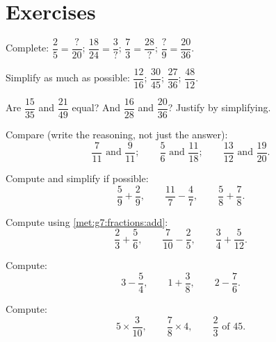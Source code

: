 \section{Exercises}

\begin{exercise}[$\star$]\label{exo:g7:fractions:1}
Complete: $\dfrac{2}{5} = \dfrac{?}{20}$; \quad
$\dfrac{18}{24} = \dfrac{3}{?}$; \quad
$\dfrac{7}{3} = \dfrac{28}{?}$; \quad
$\dfrac{?}{9} = \dfrac{20}{36}$.
\end{exercise}

\begin{exercise}[$\star$]\label{exo:g7:fractions:2}
Simplify as much as possible:
$\dfrac{12}{16}$; \quad $\dfrac{30}{45}$; \quad $\dfrac{27}{36}$;
\quad $\dfrac{48}{12}$.
\end{exercise}

\begin{exercise}[$\star$]\label{exo:g7:fractions:3}
Are $\dfrac{15}{35}$ and $\dfrac{21}{49}$ equal? And $\dfrac{16}{28}$
and $\dfrac{20}{36}$? Justify by simplifying.
\end{exercise}

\begin{exercise}[$\star$]\label{exo:g7:fractions:4}
Compare (write the reasoning, not just the answer):
\[
\frac{7}{11} \text{ and } \frac{9}{11}; \qquad
\frac{5}{6} \text{ and } \frac{11}{18}; \qquad
\frac{13}{12} \text{ and } \frac{19}{20}.
\]
\end{exercise}

\begin{exercise}[$\star$]\label{exo:g7:fractions:5}
Compute and simplify if possible:
\[
\frac{5}{9} + \frac{2}{9}, \qquad
\frac{11}{7} - \frac{4}{7}, \qquad
\frac{5}{8} + \frac{7}{8} .
\]
\end{exercise}

\begin{exercise}[$\star$]\label{exo:g7:fractions:6}
Compute using \cref{met:g7:fractions:add}:
\[
\frac{2}{3} + \frac{5}{6}, \qquad
\frac{7}{10} - \frac{2}{5}, \qquad
\frac{3}{4} + \frac{5}{12} .
\]
\end{exercise}

\begin{exercise}[$\star$]\label{exo:g7:fractions:7}
Compute:
\[
3 - \frac{5}{4}, \qquad
1 + \frac{3}{8}, \qquad
2 - \frac{7}{6} .
\]
\end{exercise}

\begin{exercise}[$\star$]\label{exo:g7:fractions:8}
Compute:
\[
5 \times \frac{3}{10}, \qquad
\frac{7}{8} \times 4, \qquad
\frac{2}{3} \text{ of } 45 .
\]
\end{exercise}

